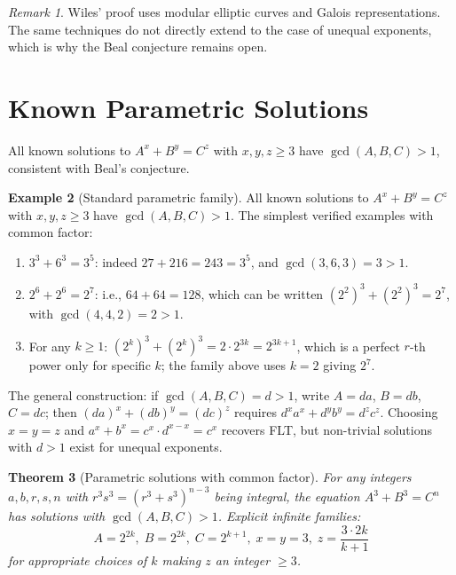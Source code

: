 \documentclass[12pt,a4paper]{amsart}
\newtheorem{theorem}{Theorem}[section]
\theoremstyle{definition}
\newtheorem{example}[theorem]{Example}
\theoremstyle{remark}
\newtheorem{remark}[theorem]{Remark}
\begin{document}
\begin{remark}
Wiles' proof uses modular elliptic curves and Galois representations. The same
techniques do not directly extend to the case of unequal exponents, which is why
the Beal conjecture remains open.
\end{remark}

\section{Known Parametric Solutions}

All known solutions to $A^x + B^y = C^z$ with $x, y, z \geq 3$ have $\gcd(A,B,C) > 1$,
consistent with Beal's conjecture.

\begin{example}[Standard parametric family]\label{ex:param}
All known solutions to $A^x + B^y = C^z$ with $x, y, z \geq 3$ have
$\gcd(A,B,C) > 1$. The simplest verified examples with common factor:
\begin{enumerate}[label=(\alph*)]
  \item $3^3 + 6^3 = 3^5$: indeed $27 + 216 = 243 = 3^5$, and $\gcd(3,6,3) = 3 > 1$.
  \item $2^6 + 2^6 = 2^7$: i.e., $64 + 64 = 128$, which can be written
        $(2^2)^3 + (2^2)^3 = 2^7$, with $\gcd(4,4,2) = 2 > 1$.
  \item For any $k \geq 1$: $(2^k)^3 + (2^k)^3 = 2 \cdot 2^{3k} = 2^{3k+1}$,
        which is a perfect $r$-th power only for specific $k$; the family above
        uses $k = 2$ giving $2^7$.
\end{enumerate}
The general construction: if $\gcd(A,B,C) = d > 1$, write $A = da$, $B = db$,
$C = dc$; then $(da)^x + (db)^y = (dc)^z$ requires $d^x a^x + d^y b^y = d^z c^z$.
Choosing $x = y = z$ and $a^x + b^x = c^x \cdot d^{x-x} = c^x$ recovers FLT,
but non-trivial solutions with $d > 1$ exist for unequal exponents.
\end{example}

\begin{theorem}[Parametric solutions with common factor]\label{thm:param}
For any integers $a, b, r, s, n$ with $r^3 s^3 = (r^3 + s^3)^{n-3}$ being
integral, the equation $A^3 + B^3 = C^n$ has solutions with $\gcd(A,B,C) > 1$.
Explicit infinite families:
\[
  A = 2^{2k},\; B = 2^{2k},\; C = 2^{k+1},\; x=y=3,\; z = \frac{3 \cdot 2k}{k+1}
\]
for appropriate choices of $k$ making $z$ an integer $\geq 3$.
\end{theorem}
\end{document}
